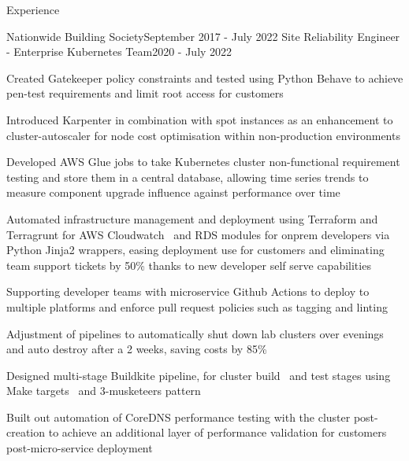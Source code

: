 \documentclass{resume} %
\begin{document}
\begin{rSection}{Experience}
\begin{rSubsection}{Nationwide Building Society}{September 2017 - July 2022}
{Site Reliability Engineer - Enterprise Kubernetes Team}{2020 - July 2022}
\normalfont
\item Created Gatekeeper policy constraints and tested using Python Behave to achieve pen-test requirements and limit root access for customers
\item Introduced Karpenter in combination with spot instances as an enhancement to cluster-autoscaler for node cost optimisation within non-production environments
\item Developed AWS Glue jobs to take Kubernetes cluster non-functional requirement testing and store them in a central database, allowing time series trends to measure component upgrade influence against performance over time
\item Automated infrastructure management and deployment using Terraform and Terragrunt for AWS Cloudwatch \ and  RDS modules for onprem developers via Python Jinja2 wrappers, easing deployment use for customers and eliminating team support tickets by 50\% thanks to new developer self serve capabilities
\item Supporting developer teams with microservice Github Actions to deploy to multiple platforms and enforce pull request policies such as tagging and linting
\item Adjustment of pipelines to automatically shut down lab clusters over evenings and auto destroy after a 2 weeks, saving costs by 85\%
\item Designed multi-stage Buildkite pipeline, for cluster build \ and  test stages using Make targets \ and  3-musketeers pattern
\item Built out automation of CoreDNS performance testing with the cluster post-creation to achieve an additional layer of performance validation for customers post-micro-service deployment
\end{rSubsection}


\end{rSection}
\end{document}
